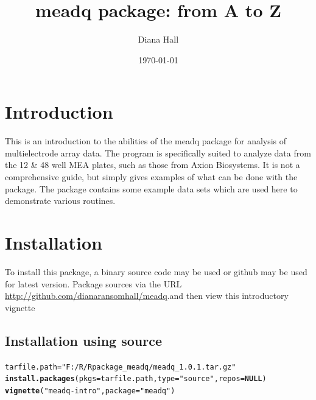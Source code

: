 \documentclass{article}\usepackage[]{graphicx}\usepackage[]{color}
\makeatletter
\newcommand{\hlstr}[1]{\textcolor[rgb]{0.192,0.494,0.8}{#1}}%
\newcommand{\hlstd}[1]{\textcolor[rgb]{0.345,0.345,0.345}{#1}}%
\newcommand{\hlkwa}[1]{\textcolor[rgb]{0.161,0.373,0.58}{\textbf{#1}}}%
\newcommand{\hlkwb}[1]{\textcolor[rgb]{0.69,0.353,0.396}{#1}}%
\newcommand{\hlkwc}[1]{\textcolor[rgb]{0.333,0.667,0.333}{#1}}%
\newcommand{\hlkwd}[1]{\textcolor[rgb]{0.737,0.353,0.396}{\textbf{#1}}}%
\newenvironment{kframe}{%
 \def\at@end@of@kframe{}%
 \ifinner\ifhmode%
  \def\at@end@of@kframe{\end{minipage}}%
  \begin{minipage}{\columnwidth}%
 \fi\fi%
 \def\FrameCommand##1{\hskip\@totalleftmargin \hskip-\fboxsep
 \colorbox{shadecolor}{##1}\hskip-\fboxsep
     \hskip-\linewidth \hskip-\@totalleftmargin \hskip\columnwidth}%
 \MakeFramed {\advance\hsize-\width
   \@totalleftmargin\z@ \linewidth\hsize
   \@setminipage}}%
 {\par\unskip\endMakeFramed%
 \at@end@of@kframe}
\newenvironment{knitrout}{}{} %
\makeatother
\begin{document}
\onehalfspacing
\title{meadq package: from A to Z}

\author{Diana Hall}
\date{\today}

\maketitle

\section*{Introduction}

This is an introduction to the abilities of the meadq package
for analysis of multielectrode array data.  The program is specifically suited to analyze data from the 12 \& 48 well MEA plates, such as those from Axion Biosystems.  It is not a comprehensive guide, but simply gives examples of what can be done with the package.
The package contains some example data sets which are used here to
demonstrate various routines. 

\section*{Installation}
To install this package, a binary source code may be used or github may be used for latest version. Package sources via the URL \url{http://github.com/dianaransomhall/meadq}.and then view this introductory vignette

\subsection*{Installation using source}
\begin{knitrout}
\color{fgcolor}\begin{kframe}
\begin{alltt}
\hlstd{tarfile.path} \hlkwb{=} \hlstr{"F:/R/Rpackage_meadq/meadq_1.0.1.tar.gz"}
\hlkwd{install.packages}\hlstd{(}\hlkwc{pkgs} \hlstd{= tarfile.path,} \hlkwc{type} \hlstd{=} \hlstr{"source"}\hlstd{,} \hlkwc{repos} \hlstd{=} \hlkwa{NULL}\hlstd{)}
\hlkwd{vignette}\hlstd{(}\hlstr{"meadq-intro"}\hlstd{,} \hlkwc{package} \hlstd{=} \hlstr{"meadq"}\hlstd{)}
\end{alltt}
\end{kframe}
\end{knitrout}
\end{document}
